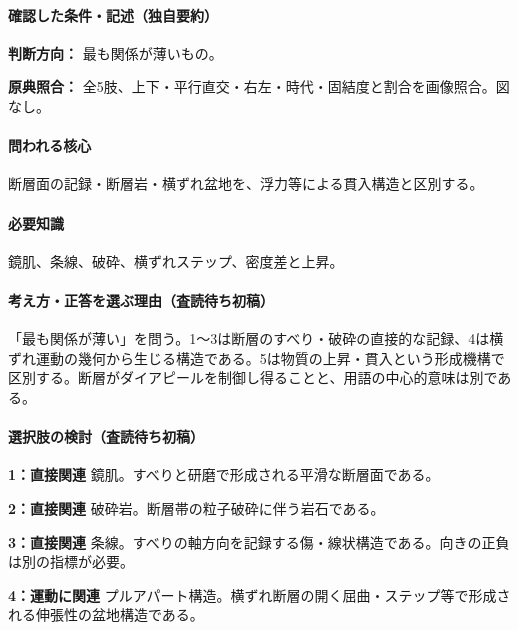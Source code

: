 \paragraph{確認した条件・記述（独自要約）}\mbox{}\par

\noindent\textbf{判断方向：} 最も関係が薄いもの。\par

\noindent\textbf{原典照合：} 全5肢、上下・平行直交・右左・時代・固結度と割合を画像照合。図なし。\par

\paragraph{問われる核心} 断層面の記録・断層岩・横ずれ盆地を、浮力等による貫入構造と区別する。

\paragraph{必要知識} 鏡肌、条線、破砕、横ずれステップ、密度差と上昇。

\paragraph{考え方・正答を選ぶ理由（査読待ち初稿）} 「最も関係が薄い」を問う。1〜3は断層のすべり・破砕の直接的な記録、4は横ずれ運動の幾何から生じる構造である。5は物質の上昇・貫入という形成機構で区別する。断層がダイアピールを制御し得ることと、用語の中心的意味は別である。

\paragraph{選択肢の検討（査読待ち初稿）}\mbox{}\par

\noindent\textbf{1：直接関連} 鏡肌。すべりと研磨で形成される平滑な断層面である。\par

\noindent\textbf{2：直接関連} 破砕岩。断層帯の粒子破砕に伴う岩石である。\par

\noindent\textbf{3：直接関連} 条線。すべりの軸方向を記録する傷・線状構造である。向きの正負は別の指標が必要。\par

\noindent\textbf{4：運動に関連} プルアパート構造。横ずれ断層の開く屈曲・ステップ等で形成される伸張性の盆地構造である。\par

